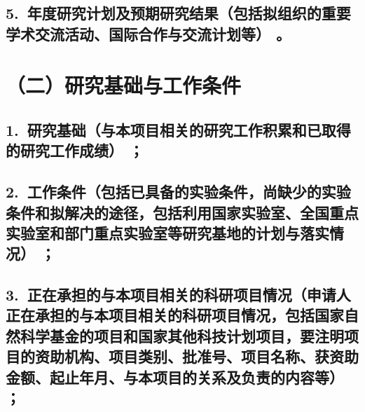 \documentclass[12pt,UTF8,AutoFakeBold=2.5,a4paper]{ctexart} %
\begin{document}



\subsection{\hspace{1.5em}  5.~{\bfseries 年度研究计划及预期研究结果}（包括拟组织的重要学术交流活动、国际合作与交流计划等）\hspace{-14pt} 。}






\section{{\bfseries（二）研究基础与工作条件}} %


\subsection{\hspace{1.45em}  1.~{\bfseries 研究基础}（与本项目相关的研究工作积累和已取得的研究工作成绩）\hspace{-14pt} ；}




\subsection{\hspace{1.45em}  2.~{\bfseries 工作条件}（包括已具备的实验条件，尚缺少的实验条件和拟解决的途径，包括利用国家实验室、全国重点实验室和部门重点实验室等研究基地的计划与落实情况）\hspace{-14pt}  ；}



\subsection{\hspace{1.45em}  3.~{\bfseries 正在承担的与本项目相关的科研项目情况}（申请人正在承担的与本项目相关的科研项目情况，包括国家自然科学基金的项目和国家其他科技计划项目，要注明项目的资助机构、项目类别、批准号、项目名称、\hspace{-4pt}获资助金额、\hspace{-4pt}起止年月、\hspace{-4pt}与本项目的关系及负责的内容等）\hspace{-12.6pt} ；\hspace{-12.6pt} }
\end{document}
